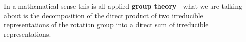 In a mathematical sense this is all applied \textbf{group theory}---what we are talking about is the decomposition of the direct product of two irreducible representations of the rotation group into a direct sum of irreducible representations.










